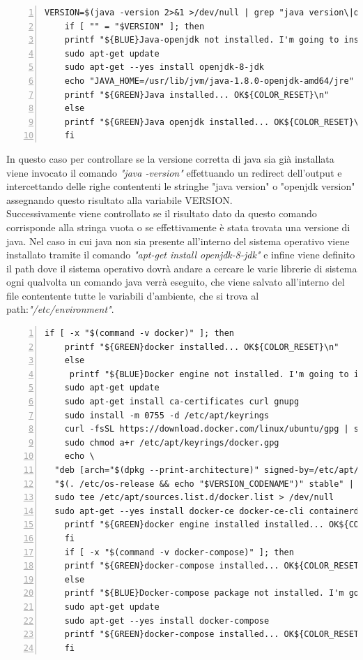 \begin{lstlisting}[style=bashstyle, caption={Installazione java openjdk}, label=lst:bash-example,numbers=left]
    VERSION=$(java -version 2>&1 >/dev/null | grep "java version\|openjdk version")
    if [ "" = "$VERSION" ]; then
    printf "${BLUE}Java-openjdk not installed. I'm going to install it\n${COLOR_RESET}\n"
    sudo apt-get update
    sudo apt-get --yes install openjdk-8-jdk 
    echo "JAVA_HOME=/usr/lib/jvm/java-1.8.0-openjdk-amd64/jre" | sudo tee -a /etc/environment
    printf "${GREEN}Java installed... OK${COLOR_RESET}\n"
    else
    printf "${GREEN}Java openjdk installed... OK${COLOR_RESET}\n"
    fi
\end{lstlisting}

In questo caso per controllare se la versione corretta di java sia già installata viene invocato il comando \textit{"java -version"} effettuando un redirect dell'output
e intercettando delle righe contententi le stringhe "java version" o "openjdk version" assegnando questo risultato alla variabile VERSION. \\
Successivamente viene controllato se il risultato dato da questo comando corrisponde alla stringa vuota o se effettivamente è stata trovata una versione di java.
Nel caso in cui java non sia presente all'interno del sistema operativo viene installato tramite il comando \textit{"apt-get install openjdk-8-jdk"} e infine viene definito il path dove il sistema operativo dovrà andare
a cercare le varie librerie di sistema ogni qualvolta un comando java verrà eseguito, che viene salvato all'interno del file contentente tutte le variabili d'ambiente, che si trova al path:\textit{"/etc/environment"}. 

\begin{lstlisting}[style=bashstyle, caption={Installazione Docker e Docker Compose}, label=lst:bash-example,numbers=left]
    if [ -x "$(command -v docker)" ]; then
    printf "${GREEN}docker installed... OK${COLOR_RESET}\n"
    else
     printf "${BLUE}Docker engine not installed. I'm going to install it\n${COLOR_RESET}\n"
    sudo apt-get update
    sudo apt-get install ca-certificates curl gnupg
    sudo install -m 0755 -d /etc/apt/keyrings
    curl -fsSL https://download.docker.com/linux/ubuntu/gpg | sudo gpg --dearmor -o /etc/apt/keyrings/docker.gpg
    sudo chmod a+r /etc/apt/keyrings/docker.gpg
    echo \
  "deb [arch="$(dpkg --print-architecture)" signed-by=/etc/apt/keyrings/docker.gpg] https://download.docker.com/linux/ubuntu \
  "$(. /etc/os-release && echo "$VERSION_CODENAME")" stable" | \
  sudo tee /etc/apt/sources.list.d/docker.list > /dev/null
  sudo apt-get --yes install docker-ce docker-ce-cli containerd.io docker-buildx-plugin docker-compose-plugin
    printf "${GREEN}docker engine installed installed... OK${COLOR_RESET}\n"
    fi
    if [ -x "$(command -v docker-compose)" ]; then
    printf "${GREEN}docker-compose installed... OK${COLOR_RESET}\n"
    else
    printf "${BLUE}Docker-compose package not installed. I'm going to install it\n${COLOR_RESET}\n"
    sudo apt-get update
    sudo apt-get --yes install docker-compose
    printf "${GREEN}docker-compose installed... OK${COLOR_RESET}\n"
    fi

\end{lstlisting}

